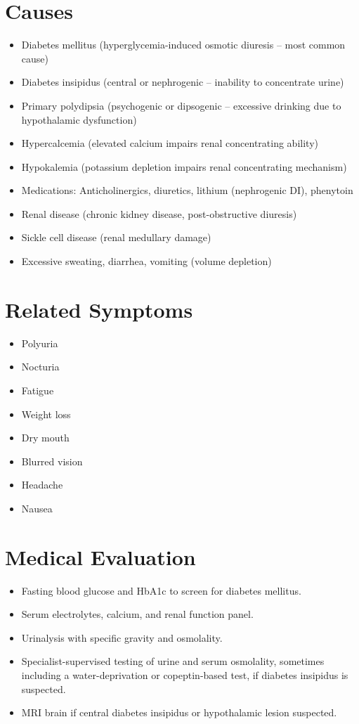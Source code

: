 \section*{Causes}
\begin{itemize}
  \item Diabetes mellitus (hyperglycemia-induced osmotic diuresis -- most common cause)
  \item Diabetes insipidus (central or nephrogenic -- inability to concentrate urine)
  \item Primary polydipsia (psychogenic or dipsogenic -- excessive drinking due to hypothalamic dysfunction)
  \item Hypercalcemia (elevated calcium impairs renal concentrating ability)
  \item Hypokalemia (potassium depletion impairs renal concentrating mechanism)
  \item Medications: Anticholinergics, diuretics, lithium (nephrogenic DI), phenytoin
  \item Renal disease (chronic kidney disease, post-obstructive diuresis)
  \item Sickle cell disease (renal medullary damage)
  \item Excessive sweating, diarrhea, vomiting (volume depletion)
\end{itemize}

\section*{Related Symptoms}
\begin{itemize}
  \item Polyuria
  \item Nocturia
  \item Fatigue
  \item Weight loss
  \item Dry mouth
  \item Blurred vision
  \item Headache
  \item Nausea
\end{itemize}

\section*{Medical Evaluation}
\begin{itemize}
  \item Fasting blood glucose and HbA1c to screen for diabetes mellitus.
  \item Serum electrolytes, calcium, and renal function panel.
  \item Urinalysis with specific gravity and osmolality.
  \item Specialist-supervised testing of urine and serum osmolality, sometimes including a water-deprivation or copeptin-based test, if diabetes insipidus is suspected.
  \item MRI brain if central diabetes insipidus or hypothalamic lesion suspected.
\end{itemize}

